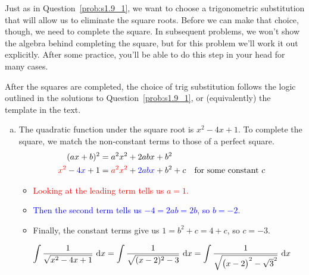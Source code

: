 \begin{solution}
Just as in Question~\ref{prob:s1.9_1}, we want to choose a trigonometric substitution that will allow us to eliminate the square roots. Before we can make that choice, though, we need to complete the square. In subsequent problems, we won't show the algebra behind completing the square, but for this problem we'll work it out explicitly. After some practice, you'll  be able to do this step in your head for many cases.

After the squares are completed, the choice of trig substitution follows the logic outlined in the solutions to Question~\ref{prob:s1.9_1}, or (equivalently) the template in the text.

\begin{enumerate}[(a)]
\item
The quadratic function under the square root is $x^2-4x+1$. To complete the square, we match the non-constant terms to those of a perfect square.
\begin{align*}
(ax+b)^2&=a^2x^2+2abx+b^2\\
\textcolor{red}{x^2}-\textcolor{blue}{4x}+1&=\textcolor{red}{a^2x^2} + \textcolor{blue}{2abx} +b^2 + c \quad\mbox{for some constant $c$}
\end{align*}
\begin{itemize}
\item \textcolor{red}{Looking at the leading term tells us $a=1$. }
\item \textcolor{blue}{Then the second term tells us $-4=2ab=2b$, so $b=-2$.}
\item Finally, the constant terms give us $1=b^2+c=4+c$, so $c=-3$.
\end{itemize}

 \[\displaystyle\int \dfrac{1}{\sqrt{x^2-4x+1}}~\dee{x}=\displaystyle\int \dfrac{1}{\sqrt{(x-2)^2-3}}~\dee{x}=\displaystyle\int \dfrac{1}{\sqrt{\left(x-2\vphantom{\sqrt{3}}\right)^2-\sqrt{3}^2}}~\dee{x}\]
 

\end{enumerate}
\end{solution}
